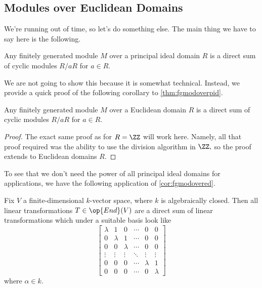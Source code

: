 \documentclass[../notes.tex]{subfiles}
\begin{document}
\subsection{Modules over Euclidean Domains}
We're running out of time, so let's do something else. The main thing we have to say here is the following.
\begin{theorem} \label{thm:fgmodoverpid}
	Any finitely generated module $M$ over a principal ideal domain $R$ is a direct sum of cyclic modules $R/aR$ for $a\in R.$
\end{theorem}
We are not going to show this because it is somewhat technical. Instead, we provide a quick proof of the following corollary to \autoref{thm:fgmodoverpid}.
\begin{corollary} \label{cor:fgmodovered}
	Any finitely generated module $M$ over a Euclidean domain $R$ is a direct sum of cyclic modules $R/aR$ for $a\in R.$
\end{corollary}
\begin{proof}
	The exact same proof as for $R=\ZZ$ will work here. Namely, all that proof required was the ability to use the division algorithm in $\ZZ,$ so the proof extends to Euclidean domains $R.$
\end{proof}
To see that we don't need the power of all principal ideal domains for applications, we have the following application of \autoref{cor:fgmodovered}.
\begin{theorem}
	Fix $V$ a finite-dimensional $k$-vector space, where $k$ is algebraically closed. Then all linear transformations $T\in\op{End}(V)$ are a direct sum of linear transformations which under a suitable basis look like
	\[\begin{bmatrix}
		\lambda & 1 & 0 & \cdots & 0 & 0 \\
		0 & \lambda & 1 & \cdots & 0 & 0 \\
		0 & 0 & \lambda & \cdots & 0 & 0 \\
		\vdots & \vdots & \vdots & \ddots & \vdots & \vdots \\
		0 & 0 & 0 & \cdots & \lambda & 1 \\
		0 & 0 & 0 & \cdots & 0 & \lambda
	\end{bmatrix}\]
	where $\alpha\in k.$
\end{theorem}
\end{document}
